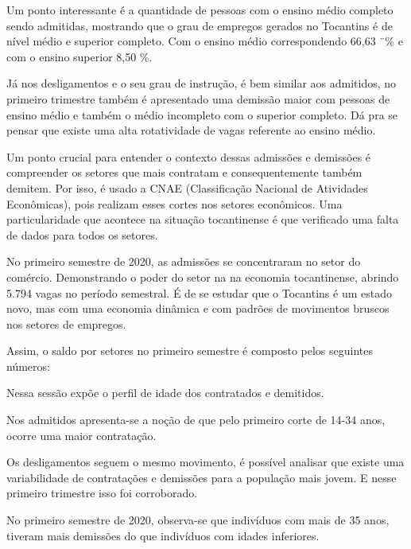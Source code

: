 \par Um ponto interessante é a quantidade de pessoas com o ensino médio completo sendo admitidas, mostrando que o grau de empregos gerados no Tocantins é de nível médio e superior completo. Com o ensino médio correspondendo 66,63 ¨\% e com o ensino superior 8,50 \%.

\par Já nos desligamentos e o seu grau de instrução, é bem similar aos admitidos, no primeiro trimestre também é apresentado uma demissão maior com pessoas de ensino médio e também o médio incompleto com o superior completo. Dá pra se pensar que existe uma alta rotatividade de vagas referente ao ensino médio.

\par Um ponto crucial para entender o contexto dessas admissões e demissões é compreender os setores que mais contratam e consequentemente também demitem. Por isso, é usado a CNAE (Classificação Nacional de Atividades Econômicas), pois realizam esses cortes nos setores econômicos. Uma particularidade que acontece na situação tocantinense é que verificado uma falta de dados para todos os setores.


\par No primeiro semestre de 2020, as admissões se concentraram no setor do comércio. Demonstrando o poder do setor na na economia tocantinense, abrindo 5.794 vagas no período semestral. É de se estudar que o Tocantins é um estado novo, mas com uma economia dinâmica e com padrões de movimentos bruscos nos setores de empregos. 
\par Assim, o saldo por setores no primeiro semestre é composto pelos seguintes números:



\par Nessa sessão expõe o perfil de idade dos contratados e demitidos.


\par Nos admitidos apresenta-se a noção de que pelo primeiro corte de 14-34 anos, ocorre uma maior contratação.


\par Os desligamentos seguem o mesmo movimento, é possível analisar que existe uma variabilidade de contratações e demissões para a população mais jovem. E nesse primeiro trimestre isso foi corroborado. 


\par No primeiro semestre de 2020, observa-se que indivíduos com mais de 35 anos, tiveram mais demissões do que indivíduos com idades inferiores.

